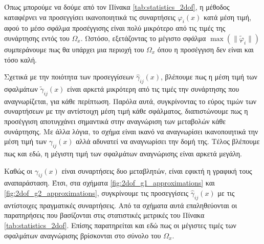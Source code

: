 Όπως μπορούμε να δούμε από τον Πίνακα \ref{tab:statistics_2dof}, η μέθοδος καταφέρνει να προσεγγίσει ικανοποιητικά τις συναρτήσεις $\varphi_i(x)$ κατά μέση τιμή, αφού το μέσο σφάλμα προσέγγισης είναι πολύ μικρότερο από τις τιμές της συνάρτησης εντός του $\Omega_x$. Ωστόσο, εξετάζοντας το μέγιστο σφάλμα $\max(\| \tilde{\varphi}_i \| )$ συμπεράνουμε πως θα υπάρχει μια περιοχή του $\Omega_x$ όπου η προσέγγιση δεν είναι και τόσο καλή.

Σχετικά με την ποιότητα των προσεγγίσεων $\hat{\gamma}_{ij}(x)$, βλέπουμε πως η μέση τιμή των σφαλμάτων $\tilde{\gamma}_{ij}(x)$ είναι αρκετά μικρότερη από τις τιμές την συνάρτησης που αναγνωρίζεται, για κάθε περίπτωση. Παρόλα αυτά, συγκρίνοντας το εύρος τιμών των συναρτήσεων με την αντίστοιχη μέση τιμή κάθε σφάλματος, διαπιστώνουμε πως η προσέγγιση αποτυγχάνει σημαντικά στην αναγνώριση των μεταβολών κάθε συνάρτησης. Με άλλα λόγια, το σχήμα είναι ικανό να αναγνωρίσει ικανοποιητικά την μέση τιμή των $\gamma_{ij}(x)$ αλλά αδυνατεί να αναγνωρίσει την δομή της. Τέλος βλέπουμε πως και εδώ, η μέγιστη τιμή των σφαλμάτων αναγνώρισης είναι αρκετά μεγάλη. 

Καθώς οι $\gamma_{ij}(x)$ είναι συναρτήσεις δυο μεταβλητών, είναι εφικτή η γραφική τους αναπαράσταση. Έτσι, στα σχήματα \ref{fig:2dof_g1_approximations} και \ref{fig:2dof_g2_approximations}, συγκρίνουμε τις προσεγγίσεις $\hat{\gamma}_{ij}(x)$ με τις αντίστοιχες πραγματικές συναρτήσεις. Από τα σχήματα αυτά επαληθεύονται οι παρατηρήσεις που βασίζονται στις στατιστικές μετρικές του Πίνακα \ref{tab:statistics_2dof}. Επίσης παρατηρείται και εδώ πως οι μέγιστες τιμές των σφαλμάτων αναγνώρισης βρίσκονται στο σύνολο του $\Omega_x$.

